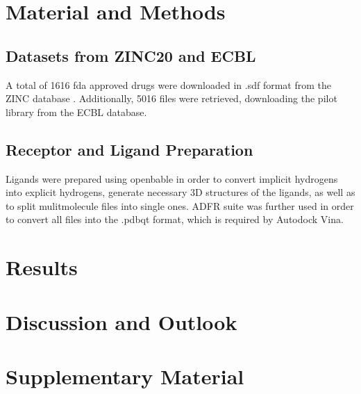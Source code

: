 \documentclass[11pt, letterpaper, titlepage]{article}
\renewcommand{\cite}{\parencite}
\begin{document}
\section{Material and Methods}
\subsection{Datasets from ZINC20 and ECBL}
A total of 1616 fda approved drugs were downloaded in .sdf format from the ZINC database \cite{Irwin.2020}. Additionally, 5016 files were retrieved, downloading the pilot library from the ECBL database.

\subsection{Receptor and Ligand Preparation}
Ligands were prepared using openbable in order to convert implicit hydrogens into explicit hydrogens, generate necessary 3D structures of the ligands, as well as to split mulitmolecule files into single ones. ADFR suite was further used in order to convert all files into the .pdbqt format, which is required by Autodock Vina. 
 
\section{Results}

\FloatBarrier

\section{Discussion and Outlook}

\section{Supplementary Material}

\pagebreak
\FloatBarrier
\renewcommand{\bibname}{References}  %
\printbibliography
\end{document}
